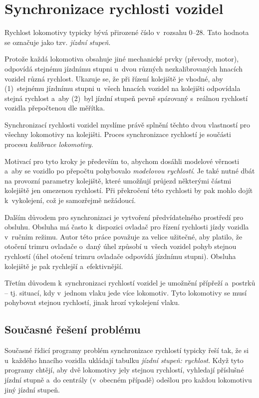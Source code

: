 \section{Synchronizace rychlosti vozidel}
\label{sec:sync-rych}

Rychlost lokomotivy typicky bývá přirozené číslo v~rozsahu $0$--$28$. Tato
hodnota se označuje jako tzv. \textit{jízdní stupeň}.

Protože každá lokomotiva obsahuje jiné mechanické prvky (převody, motor),
odpovídá stejnému jízdnímu stupni u~dvou různých nezkalibrovaných hnacích
vozidel různá rychlost. Ukazuje se, že při řízení kolejiště je vhodné, aby
(1)~stejnému jízdnímu stupni u~všech hnacích vozidel na kolejišti odpovídala
stejná rychlost a~aby (2)~byl jízdní stupeň pevně spárovaný s~reálnou rychlostí
vozidla přepočtenou dle měřítka.

Synchronizací rychlosti vozidel myslíme právě splnění těchto dvou vlastností
pro všechny lokomotivy na kolejišti. Proces synchronizace rychlostí je součásti
procesu \textit{kalibrace lokomotivy}.

Motivací pro tyto kroky je především to, abychom dosáhli modelové věrnosti
a~aby se vozidlo po přepočtu pohybovalo \textit{modelovou rychlostí}. Je také
nutné dbát na provozní parametry kolejiště, které umožňují průjezd některými
částmi kolejiště jen omezenou rychlostí. Při překročení této rychlosti by pak
mohlo dojít k~vykolejení, což je samozřejmě nežádoucí.

Dalším důvodem pro synchronizaci je vytvoření předvídatelného prostředí pro
obsluhu. Obsluha má často k~dispozici ovladač pro řízení rychlosti jízdy
vozidla v~ručním režimu. Autor této práce považuje za velice užitečné, aby
platilo, že otočení trimru ovladače o~daný úhel způsobí u~všech vozidel pohyb
stejnou rychlostí (úhel otočení trimru ovladače odpovídá jízdnímu stupni).
Obsluha kolejiště je pak rychlejší a~efektivnější.

Třetím důvodem k~synchronizaci rychlostí vozidel je umožnění přípřeží a~postrků
-- tj.  situací, kdy v~jednom vlaku jede více lokomotiv. Tyto lokomotivy se
musí pohybovat stejnou rychlostí, jinak hrozí vykolejení vlaku.

\subsection{Současné řešení problému}

Současné řídicí programy problém synchronizace rychlostí typicky řeší tak, že
si u~každého hnacího vozidla ukládají tabulku \textit{jízdní stupeň: rychlost}.
Když tyto programy chtějí, aby dvě lokomotivy jely stejnou rychlostí, vyhledají
příslušné jízdní stupně a~do centrály (v~obecném případě) odešlou pro každou
lokomotivu jiný jízdní stupeň.

